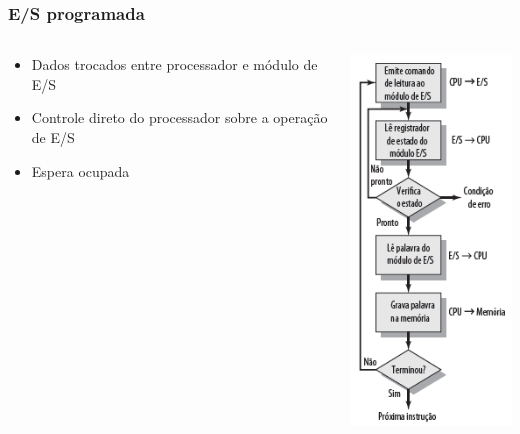 \documentclass[aspectratio=169,
				xcolor=table]{beamer}
\begin{document}
	\begin{frame}
		\frametitle{E/S programada}
		\begin{columns}
			\begin{column}{0.7\textwidth}
				\begin{itemize}
					\item Dados trocados entre processador e módulo de E/S
					\vspace{1em}
					\item Controle direto do processador sobre a operação de E/S
					\vspace{1em}
					\item Espera ocupada
				\end{itemize}			
			\end{column}
			\begin{column}{0.3\textwidth}
				\includegraphics[height=.7\textheight, keepaspectratio]{../figs/cap10/programada.png} 
			\end{column}
		\end{columns}

	\end{frame}
	
\end{document}
